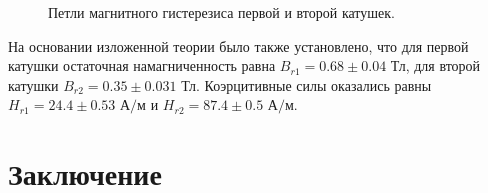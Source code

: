 \documentclass[a4paper, 12pt]{article}
\begin{document}
\begin{figure}[H]
	\centering
	\caption{Петли магнитного гистерезиса первой  и второй  катушек.}
\end{figure}

На основании изложенной теории было также установлено, что для первой катушки остаточная намагниченность равна $\boxed{B_{r1} = 0.68 \pm 0.04 \text{ Тл}}$, для второй катушки $\boxed{B_{r2} = 0.35 \pm 0.031 \text{ Тл}}$. Коэрцитивные силы оказались равны $\boxed{H_{r1} = 24.4 \pm  0.53 \text{ А/м}}$ и $\boxed{H_{r2} = 87.4 \pm 0.5\text{ А/м}}$.

\section{Заключение} %
\end{document}
